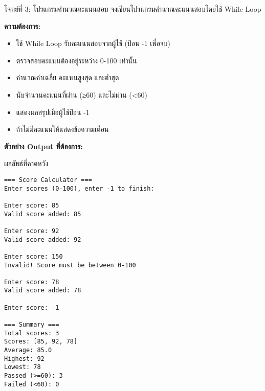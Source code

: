 \documentclass[12pt,a4paper]{article}
\newcommand{\textlight}[1]{{\thailightfont #1}}
\begin{document}
\begin{exercisebox}{โจทย์ที่ 3: โปรแกรมคำนวณคะแนนสอบ}
\textlight{จงเขียนโปรแกรมคำนวณคะแนนสอบโดยใช้ While Loop}

\textlight{\textbf{ความต้องการ:}}
\begin{itemize}
    \item \textlight{ใช้ While Loop รับคะแนนสอบจากผู้ใช้ (ป้อน -1 เพื่อจบ)}
    \item \textlight{ตรวจสอบคะแนนต้องอยู่ระหว่าง 0-100 เท่านั้น}
    \item \textlight{คำนวณค่าเฉลี่ย คะแนนสูงสุด และต่ำสุด}
    \item \textlight{นับจำนวนคะแนนที่ผ่าน (≥60) และไม่ผ่าน (<60)}
    \item \textlight{แสดงผลสรุปเมื่อผู้ใช้ป้อน -1}
    \item \textlight{ถ้าไม่มีคะแนนให้แสดงข้อความเตือน}
\end{itemize}

\textlight{\textbf{ตัวอย่าง Output ที่ต้องการ:}}
\begin{codebox}{ผลลัพธ์ที่คาดหวัง}
\begin{lstlisting}[style=python]
=== Score Calculator ===
Enter scores (0-100), enter -1 to finish:

Enter score: 85
Valid score added: 85

Enter score: 92
Valid score added: 92

Enter score: 150
Invalid! Score must be between 0-100

Enter score: 78
Valid score added: 78

Enter score: -1

=== Summary ===
Total scores: 3
Scores: [85, 92, 78]
Average: 85.0
Highest: 92
Lowest: 78
Passed (>=60): 3
Failed (<60): 0
\end{lstlisting}
\end{codebox}

\end{exercisebox}
\end{document}
